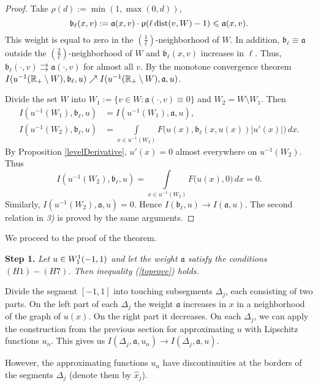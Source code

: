 \begin{proof}
Take $\rho(d) := \min(1, \max(0, d))$,
$$\mathfrak b_{\ell}(x, v) := \mathfrak a(x, v) \cdot \uprho(\ell \operatorname{dist}(v, W) - 1) \leqslant \mathfrak a(x, v).$$
This weight is equal to zero in the $\left(\frac{1}{\ell}\right)$-neighborhood of $W$.
In addition, $\mathfrak b_{\ell} \equiv \mathfrak a$ outside the $\left(\frac{2}{\ell}\right)$-neighborhood of $W$ and
$\mathfrak b_{\ell}(x, v)$ increases in $\ell$.
Thus, $\mathfrak b_{\ell}(\cdot, v) \rightrightarrows \mathfrak a(\cdot, v)$ for almost all $v$.
By the monotone convergence theorem
$I(u^{-1}(\mathbb R_+ \setminus W), \mathfrak b_{\ell}, u) \nearrow I(u^{-1}(\mathbb R_+ \setminus W), \mathfrak a, u)$.

Divide the set $W$ into $W_1 := \{v \in W: \mathfrak a(\cdot, v) \equiv 0\}$ and $W_2 = W \setminus W_1$.
Then
$$
\begin{aligned}
I(u^{-1}(W_1), \mathfrak b_{\ell}, u) &= I(u^{-1}(W_1), \mathfrak a, u),\\
I(u^{-1}(W_2), \mathfrak b_{\ell}, u) &= \int\limits_{x \in u^{-1}(W_2)} F\big(u(x), \mathfrak b_{\ell}(x, u(x)) |u'(x)|\big) \, dx.
\end{aligned}
$$
By Proposition \ref{levelDerivative}, $u'(x) = 0$ almost everywhere on $u^{-1}(W_2)$.
Thus
$$I(u^{-1}(W_2), \mathfrak b_{\ell}, u) = \int\limits_{x \in u^{-1}(W_2)} F\big(u(x), 0\big) \, dx = 0.$$
Similarly, $I(u^{-1}(W_2), \mathfrak a, u) = 0$. Hence $I(\mathfrak b_{\ell}, u) \to I(\mathfrak a, u)$.
The second relation in \textit{3)} is proved by the same arguments.
\end{proof}

We proceed to the proof of the theorem.

\bigskip
\textbf{Step 1.} \textit{Let $u \in W_1^1(-1, 1)$ and let the weight $\mathfrak a$ satisfy the conditions $(H1)-(H7)$.
Then inequality (\ref{toprove}) holds.}

Divide the segment $[-1, 1]$ into touching subsegments $\Delta_j$, each consisting of two parts.
On the left part of each $\Delta_j$ the weight $\mathfrak a$ increases in $x$ in a neighborhood
of the graph of $u(x)$. On the right part it decreases.
On each $\Delta_j$, we can apply the construction from the previous section
for approximating $u$ with Lipschitz functions $u_n$.
This gives us $I(\Delta_j, \mathfrak a, u_n) \to I(\Delta_j, \mathfrak a, u)$.

However, the approximating functions $u_n$ have discontinuities at the borders of the segments $\Delta_j$
(denote them by $\hat{x}_j$).

